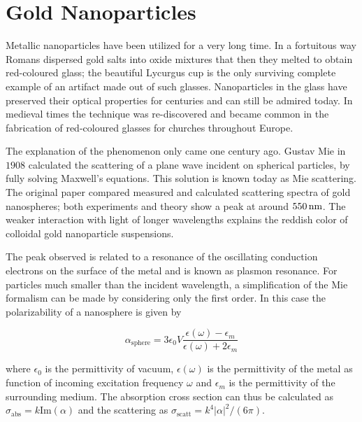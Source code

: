 \section{Gold Nanoparticles}
Metallic nanoparticles have been utilized for a very long time. In a fortuitous
way Romans dispersed gold salts into oxide mixtures that then they melted to
obtain red-coloured glass; the beautiful Lycurgus
cup\cite{barber1990investigation} is the only surviving complete example of an
artifact made out of such glasses. Nanoparticles in the glass have preserved
their optical properties for centuries and can still be admired today. In
medieval times the technique was re-discovered and became common in the
fabrication of red-coloured glasses for churches throughout Europe. 

The explanation of the phenomenon only came one century ago. Gustav Mie in
$1908$ calculated the scattering of a plane wave incident on spherical
particles\cite{mie1908beitrage}, by fully solving Maxwell's equations.
This solution is known today as Mie scattering. The original paper compared
measured and calculated scattering spectra of gold nanospheres; both experiments
and theory show a peak at around $550\,\textrm{nm}$. The weaker interaction with light of
longer wavelengths explains the reddish color of colloidal gold nanoparticle
suspensions.

The peak observed is related to a resonance of the oscillating conduction
electrons on the surface of the metal and is known as plasmon resonance. For
particles much smaller than the incident wavelength, a simplification of the Mie
formalism can be made by considering only the first order. In this case the
polarizability of a nanosphere is given by\cite{bohren2008absorption}

\begin{equation}\label{eqn:polarizability}
	\alpha_{\textrm{sphere}} =
	3\epsilon_0V\frac{\epsilon(\omega)-\epsilon_m}{\epsilon(\omega)+2\epsilon_m}
\end{equation}

\noindent where $\epsilon_0$ is the permittivity of vacuum, $\epsilon(\omega)$
is the permittivity of the metal as function of incoming excitation frequency $\omega$
and $\epsilon_m$ is the permittivity of the surrounding medium. The absorption
cross section can thus be calculated as
$\sigma_\textrm{abs}=k\textrm{Im}(\alpha)$ and the scattering as
$\sigma_\textrm{scatt}=k^4|\alpha|^2/(6\pi)$.

